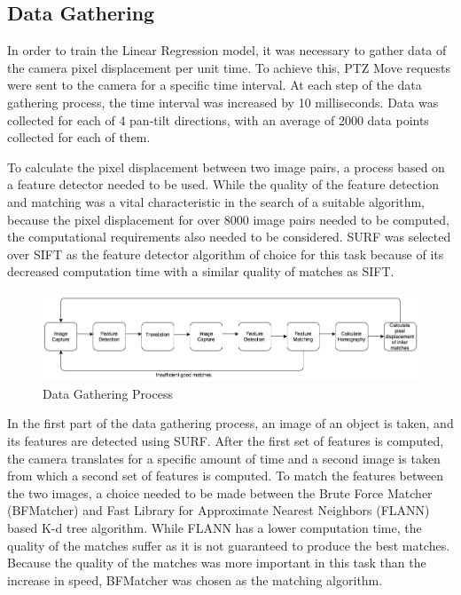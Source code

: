 \documentclass{l4proj}
\begin{document}
\subsection{Data Gathering}

In order to train the Linear Regression model, it was necessary to gather data of the camera pixel displacement per unit time. To achieve this, PTZ Move requests were sent to the camera for a specific time interval. At each step of the data gathering process, the time interval was increased by 10 milliseconds. Data was collected for each of 4 pan-tilt directions, with an average of 2000 data points collected for each of them. 

To calculate the pixel displacement between two image pairs, a process based on a feature detector needed to be used. While the quality of the feature detection and matching was a vital characteristic in the search of a suitable algorithm, because the pixel displacement for over 8000 image pairs needed to be computed, the computational requirements also needed to be considered. SURF was selected over SIFT as the feature detector algorithm of choice for this task because of its decreased computation time with a similar quality of matches as SIFT. 

\begin{figure}[ht]
    \centering
    \includegraphics[width=1\textwidth]{l4template-master/images/dataGathering.png}
    \caption{Data Gathering Process}
    \label{datagathering}
\end{figure}


In the first part of the data gathering process, an image of an object is taken, and its features are detected using SURF. After the first set of features is computed, the camera translates for a specific amount of time and a second image is taken from which a second set of features is computed. To match the features between the two images, a choice needed to be made between the Brute Force Matcher (BFMatcher) and Fast Library for Approximate Nearest Neighbors (FLANN) based K-d tree algorithm. While FLANN has a lower computation time, the quality of the matches suffer as it is not guaranteed to produce the best matches. Because the quality of the matches was more important in this task than the increase in speed, BFMatcher was chosen as the matching algorithm. 
\end{document}
